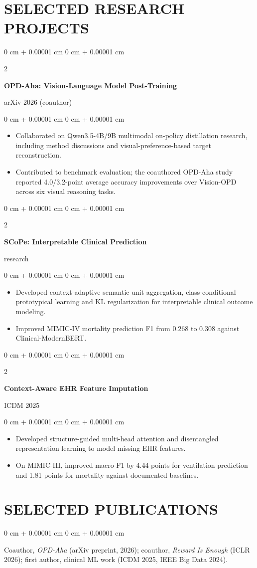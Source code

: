 \documentclass[10pt, letterpaper]{article}
\newenvironment{highlights}{
    \begin{itemize}[
        topsep=0.03 cm,
        parsep=0.03 cm,
        partopsep=0pt,
        itemsep=0pt,
        leftmargin=0 cm + 10pt
    ]
}{
    \end{itemize}
} %
\newenvironment{onecolentry}{
    \begin{adjustwidth}{
        0 cm + 0.00001 cm
    }{
        0 cm + 0.00001 cm
    }
}{
    \end{adjustwidth}
} %
\newenvironment{twocolentry}[2][]{
    \onecolentry
    \def\secondColumn{#2}
    \setcolumnwidth{\fill, 4.5 cm}
    \begin{paracol}{2}
}{
    \switchcolumn \raggedleft \secondColumn
    \end{paracol}
    \endonecolentry
} %
\begin{document}
\section{SELECTED RESEARCH PROJECTS}
\begin{twocolentry}{arXiv 2026 (coauthor)}
\textbf{OPD-Aha: Vision-Language Model Post-Training}
\end{twocolentry}
\begin{onecolentry}
\begin{highlights}
\item Collaborated on Qwen3.5-4B/9B multimodal on-policy distillation research, including method discussions and visual-preference-based target reconstruction.
\item Contributed to benchmark evaluation; the coauthored OPD-Aha study reported 4.0/3.2-point average accuracy improvements over Vision-OPD across six visual reasoning tasks.
\end{highlights}
\end{onecolentry}
\vspace{0.03 cm}
\begin{twocolentry}{2026 research}
\textbf{SCoPe: Interpretable Clinical Prediction}
\end{twocolentry}
\begin{onecolentry}
\begin{highlights}
\item Developed context-adaptive semantic unit aggregation, class-conditional prototypical learning and KL regularization for interpretable clinical outcome modeling.
\item Improved MIMIC-IV mortality prediction F1 from 0.268 to 0.308 against Clinical-ModernBERT.
\end{highlights}
\end{onecolentry}
\vspace{0.03 cm}
\begin{twocolentry}{ICDM 2025}
\textbf{Context-Aware EHR Feature Imputation}
\end{twocolentry}
\begin{onecolentry}
\begin{highlights}
\item Developed structure-guided multi-head attention and disentangled representation learning to model missing EHR features.
\item On MIMIC-III, improved macro-F1 by 4.44 points for ventilation prediction and 1.81 points for mortality against documented baselines.
\end{highlights}
\end{onecolentry}
\vspace{0.03 cm}
\section{SELECTED PUBLICATIONS}
\begin{onecolentry}
Coauthor, \textit{OPD-Aha} (arXiv preprint, 2026); coauthor, \textit{Reward Is Enough} (ICLR 2026); first author, clinical ML work (ICDM 2025, IEEE Big Data 2024).
\end{onecolentry}
\end{document}
